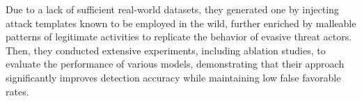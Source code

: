 Due to a lack of sufficient real-world datasets, they generated one by injecting attack templates known to be employed in the wild, further enriched by malleable patterns of legitimate activities to replicate the behavior of evasive threat actors. Then, they conducted extensive experiments, including ablation studies, to evaluate the performance of various models, demonstrating that their approach significantly improves detection accuracy while maintaining low false favorable rates.

